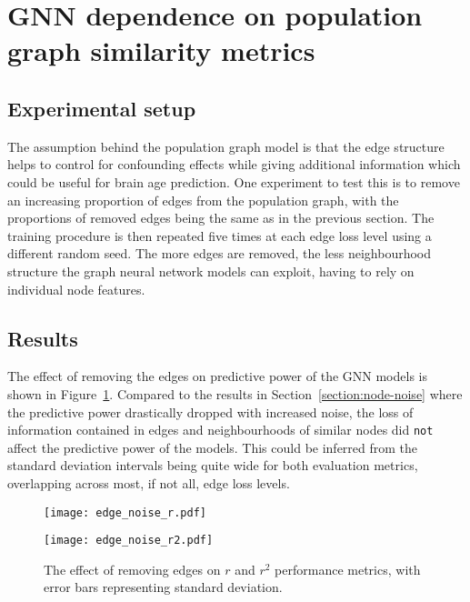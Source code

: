 \section{GNN dependence on population graph similarity metrics}
\subsection{Experimental setup}
The assumption behind the population graph model is that the edge structure helps to control for confounding effects while giving additional information which could be useful for brain age prediction. One experiment to test this is to remove an increasing proportion of edges from the population graph, with the proportions of removed edges being the same as in the previous section. The training procedure is then repeated five times at each edge loss level using a different random seed. The more edges are removed, the less neighbourhood structure the graph neural network models can exploit, having to rely on individual node features. 

\subsection{Results}
The effect of removing the edges on predictive power of the GNN models is shown in Figure~\ref{figure:edge-noise}. Compared to the results in Section~\ref{section:node-noise} where the predictive power drastically dropped with increased noise, the loss of information contained in edges and neighbourhoods of similar nodes did \texttt{not} affect the predictive power of the models. This could be inferred from the standard deviation intervals being quite wide for both evaluation metrics, overlapping across most, if not all, edge loss levels.

\begin{figure}[h]
    \centering
    \texttt{[image: edge\_noise\_r.pdf]}

    \texttt{[image: edge\_noise\_r2.pdf]}
    \caption{The effect of removing edges on $r$ and $r^2$ performance metrics, with error bars representing standard deviation.}\label{figure:edge-noise}
\end{figure}


